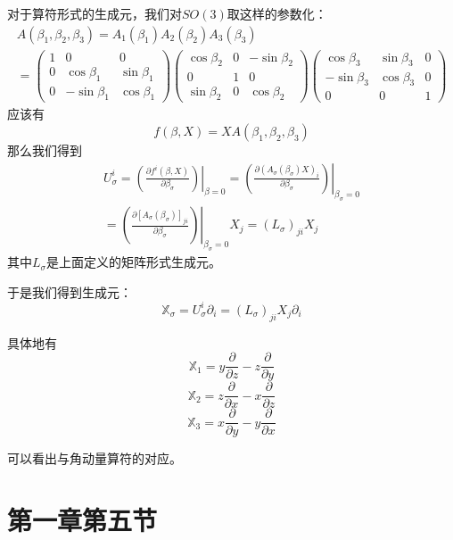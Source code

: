 \documentclass{ctexart}
\newcommand{\pp}[2]{\frac{\partial #1}{\partial #2}}
\newcommand{\ppat}[3]{\left.\left(\pp{#1}{#2}\right)\right|_{#3}}
\begin{document}
	对于算符形式的生成元，我们对$SO(3)$取这样的参数化：
	\begin{multline}
	A(\beta_1,\beta_2,\beta_3)=A_1(\beta_1)A_2(\beta_2)A_3(\beta_3)\\=
	\begin{pmatrix} 1 & 0 & 0 \\ 0 & \cos\beta_1 & \sin\beta_1 \\ 0 & -\sin\beta_1 & \cos\beta_1 \end{pmatrix}
	\begin{pmatrix} \cos\beta_2 & 0 & -\sin\beta_2 \\ 0 & 1 & 0 \\ \sin\beta_2 & 0 & \cos\beta_2 \end{pmatrix}
	\begin{pmatrix} \cos\beta_3 & \sin\beta_3 & 0 \\ -\sin\beta_3 & \cos\beta_3 & 0 \\ 0 & 0 & 1 \end{pmatrix}
	\end{multline}
	应该有
	\begin{equation}
	f(\beta,X)=XA(\beta_1,\beta_2,\beta_3)
	\end{equation}
	那么我们得到
	\begin{multline}
	U^i_\sigma=\ppat{f^i(\beta,X)}{\beta_\sigma}{\beta=0}=\ppat{(A_\sigma(\beta_\sigma)X)_i}{\beta_\sigma}{\beta_\sigma=0}\\=\ppat{\left[A_\sigma(\beta_\sigma)\right]_{ji}}{\beta_\sigma}{\beta_\sigma=0}X_j=(L_\sigma)_{ji}X_j
	\end{multline}
	其中$L_\sigma$是上面定义的矩阵形式生成元。
	
	于是我们得到生成元：
	\begin{equation}
	\mathbb X_\sigma=U^i_\sigma\partial_i=(L_\sigma)_{ji}X_j\partial_i
	\end{equation}
	
	具体地有
	\begin{equation}
	\mathbb X_1=y\pp{}{z}-z\pp{}{y}
	\end{equation}
	\begin{equation}
	\mathbb X_2=z\pp{}{x}-x\pp{}{z}
	\end{equation}
	\begin{equation}
	\mathbb X_3=x\pp{}{y}-y\pp{}{x}
	\end{equation}
	
	可以看出与角动量算符的对应。
	
	\section{第一章第五节}
	
\end{document}
